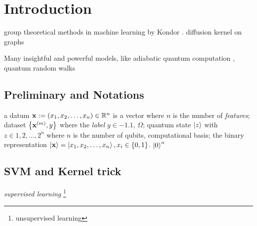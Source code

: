 
\section{Introduction}

group theoretical methods in machine learning by Kondor \cite{kondorGroupTheoreticalMethods2008}.
diffusion kernel on graphs \cite{kondorDiffusionKernelsGraphs2002}

Many insightful and powerful models, like adiabatic quantum computation \cite{farhiQuantumComputationAdiabatic2000}, quantum random walks \cite{childsQuantumInformationProcessing2004} 

\subsection{Preliminary and Notations}
a datum $\vb{x}:= (x_1,x_2,\dots,x_n) \in \mathbb{R}^n$ is a vector where $n$ is the number of \emph{features};
dataset $\qty{\vb{x}^{(m)}, y}$ where the \emph{label} $y\in\qty{-1,1}$,
$\Omega$;
quantum state $\ket{z}$ with $z\in {1,2,\dots,2^n}$ where $n$ is the number of qubits,
computational basis; 
the binary representation $\ket{\vb{x}}=\ket{x_1,x_2,\dots,x_n},x_i\in \qty{0,1}$.
$\ket{0}^n$

\subsection{SVM and Kernel trick}\label{sec:svm}
\emph{supervised learning} 
\footnote{unsupervised learning}
